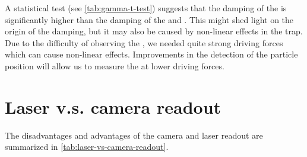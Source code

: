 A statistical test (see \autoref{tab:gamma-t-test}) suggests that the damping of the \zmode is significantly higher than the damping of the \xmode and \ymode. This might shed light on the origin of the damping, but it may also be caused by non-linear effects in the trap. Due to the difficulty of observing the \zmode, we needed quite strong driving forces which can cause non-linear effects. Improvements in the detection of the particle position will allow us to measure the \zmode at lower driving forces.

\section*{Laser v.s. camera readout}
The disadvantages and advantages of the camera and laser readout are summarized in \autoref{tab:laser-vs-camera-readout}.

